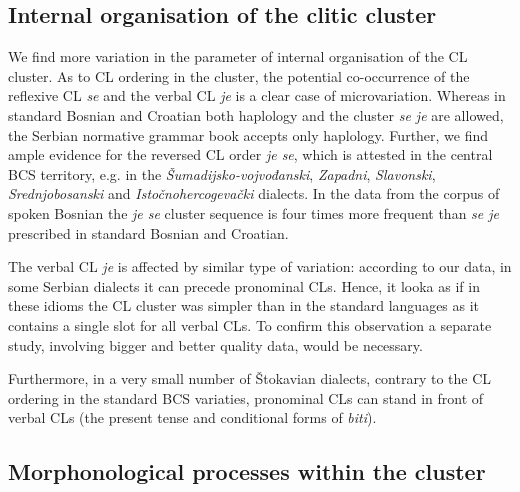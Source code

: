 \subsection{Internal organisation of the clitic cluster}



We find more variation in the parameter of internal organisation of the CL cluster. As to CL ordering in the cluster, the potential co-occurrence of the reflexive CL \textit{se} and the verbal CL \textit{je} is a clear case of microvariation. Whereas in standard Bosnian and Croatian both haplology and the cluster \textit{se je} are allowed, the Serbian normative grammar book \citet{PiperKlajn14} accepts only haplology. Further, we find ample evidence for the reversed CL order \textit{je se}, which is attested in the central BCS territory, e.g. in the \textit{Šumadijsko-vojvođanski}, \textit{Zapadni}, \textit{Slavonski}, \textit{Srednjobosanski} and \textit{Istočnohercogevački} dialects. In the data from the corpus of spoken Bosnian the \textit{je se} cluster sequence is four times more frequent than \textit{se je} prescribed in standard Bosnian and Croatian. 

The verbal CL \textit{je} is affected by similar type of variation: according to our data, in some Serbian dialects it can precede pronominal CLs. Hence, it looka as if in these idioms the CL cluster was simpler than in the standard languages as it contains a single slot for all verbal CLs. To confirm this observation a separate study, involving bigger and better quality data, would be necessary.

Furthermore, in a very small number of Štokavian dialects, contrary to the CL ordering in the standard BCS variaties, pronominal CLs can stand in front of verbal CLs (the present tense and conditional forms of \textit{biti}). 

\subsection{Morphonological processes within the cluster}

